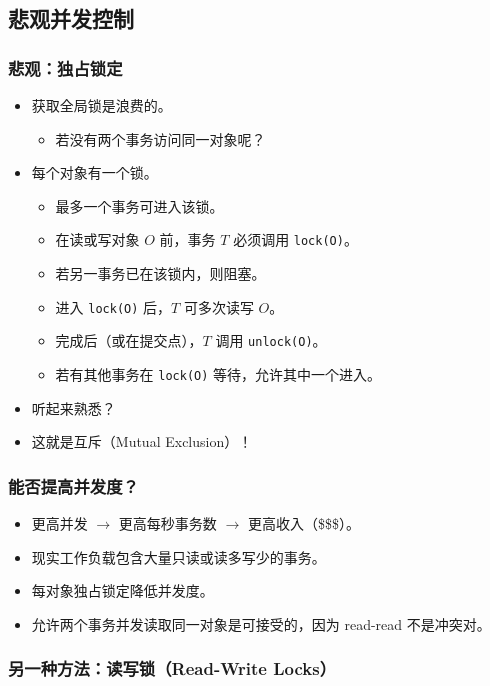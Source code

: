 \documentclass[UTF8,a4paper,11pt]{ctexart}
\newcommand{\code}[1]{\texttt{#1}}
\begin{document}
\subsection{悲观并发控制}

\subsubsection{悲观：独占锁定}

\begin{itemize}
  \item 获取全局锁是浪费的。
  \begin{itemize}
    \item 若没有两个事务访问同一对象呢？
  \end{itemize}
  \item 每个对象有一个锁。
  \begin{itemize}
    \item 最多一个事务可进入该锁。
    \item 在读或写对象 $O$ 前，事务 $T$ 必须调用 \code{lock(O)}。
    \item 若另一事务已在该锁内，则阻塞。
    \item 进入 \code{lock(O)} 后，$T$ 可多次读写 $O$。
    \item 完成后（或在提交点），$T$ 调用 \code{unlock(O)}。
    \item 若有其他事务在 \code{lock(O)} 等待，允许其中一个进入。
  \end{itemize}
  \item 听起来熟悉？
  \item 这就是互斥（Mutual Exclusion）！
\end{itemize}

\subsubsection{能否提高并发度？}

\begin{itemize}
  \item 更高并发 $\rightarrow$ 更高每秒事务数 $\rightarrow$ 更高收入（\$\$\$）。
  \item 现实工作负载包含大量只读或读多写少的事务。
  \item 每对象独占锁定降低并发度。
  \item 允许两个事务并发读取同一对象是可接受的，因为 read-read 不是冲突对。
\end{itemize}

\subsubsection{另一种方法：读写锁（Read-Write Locks）}
\end{document}
